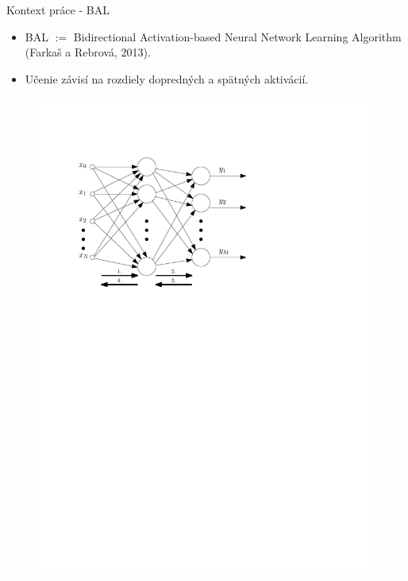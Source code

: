 \documentclass[xcolor=dvipsnames]{beamer}
\begin{document}

\newcommand{\Bx}{{\bf x}}
\newcommand{\By}{{\bf y}}
\newcommand{\Bh}{{\bf h}}
\newcommand{\Bw}{{\bf w}}
\newcommand{\Bc}{{\bf c}}

\begin{frame}{Kontext práce - BAL}
  \begin{itemize}
    \item BAL $:=$ Bidirectional Activation-based Neural Network Learning Algorithm (Farkaš a Rebrová, 2013).
    \item Učenie závisí na rozdiely dopredných a spätných aktivácií. 
  \end{itemize}
  
  \begin{figure}[h!]  
    \centering
    \vspace{-5pt} 
    \includegraphics[scale=0.75]{img/bal.pdf}
  \end{figure} 
\end{frame}
\end{document}

